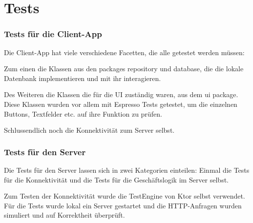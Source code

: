 
\section{Tests}

    \subsubsection{Tests für die Client-App}

        Die Client-App hat viele verschiedene Facetten, die alle getestet werden müssen:

        Zum einen die Klassen aus den packages repository und database, die die lokale Datenbank implementieren und mit ihr interagieren. 

        Des Weiteren die Klassen die für die UI zuständig waren, aus dem ui package. Diese Klassen wurden vor allem mit Espresso Tests getestet, um die einzelnen Buttons, Textfelder etc. auf ihre Funktion zu prüfen.

        Schlussendlich noch die Konnektivität zum Server selbst.

    \subsubsection{Tests für den Server}

        Die Tests für den Server lassen sich in zwei Kategorien einteilen: Einmal die Tests für die Konnektivität und die Tests für die Geschäftslogik im Server selbst.

        Zum Testen der Konnektivität wurde die TestEngine von Ktor selbst verwendet. Für die Tests wurde lokal ein Server gestartet und die HTTP-Anfragen wurden simuliert und auf Korrektheit überprüft.
